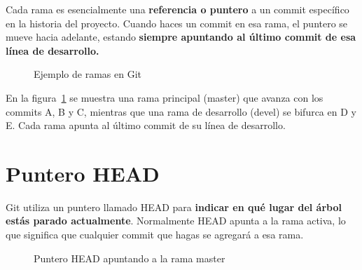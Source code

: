 \documentclass{apuntes_itsv}
\begin{document}
Cada rama es esencialmente una \textbf{referencia o puntero} a un commit específico en la historia del proyecto.
Cuando haces un commit en esa rama, el puntero se mueve hacia adelante, estando \textbf{siempre apuntando al
último commit de esa línea de desarrollo.}

\begin{figure}[h]
  \centering
  \caption{Ejemplo de ramas en Git}
  \label{fig:git_branches}
\end{figure}

En la figura~\ref{fig:git_branches} se muestra una rama principal (master) que avanza con los commits
A, B y C, mientras que una rama de desarrollo (devel) se bifurca en D y E. Cada rama apunta al último
commit de su línea de desarrollo.

\section{Puntero HEAD}
Git utiliza un puntero llamado HEAD para \textbf{indicar en qué lugar del árbol estás parado actualmente}.
Normalmente HEAD apunta a la rama activa, lo que significa que cualquier commit que hagas se agregará a esa rama.

\begin{figure}[h]
  \centering
  \caption{Puntero HEAD apuntando a la rama master}
  \label{fig:git_head_master}
\end{figure}
\end{document}
